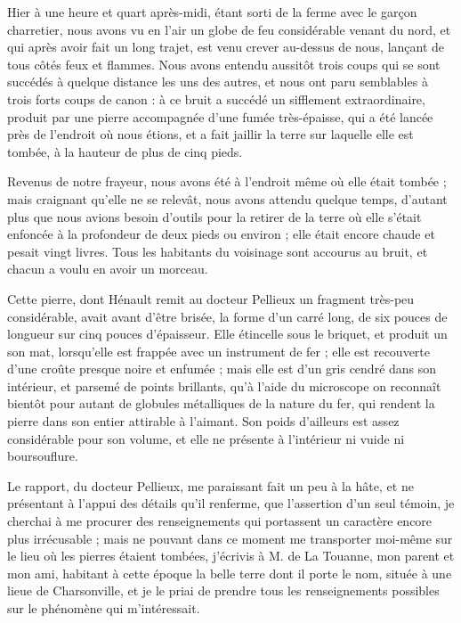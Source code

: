 \documentclass[a4paper, 12pt, oneside, french]{article}
\begin{document}
\og Hier à une heure et quart après-midi, étant sorti de la ferme avec le garçon charretier, nous avons vu en l'air un globe de feu considérable venant du nord, et qui après avoir fait un long trajet, est venu crever au-dessus de nous, lançant de tous côtés feux et flammes. Nous avons entendu aussitôt trois coups qui se sont succédés à quelque distance les uns des autres, et nous ont paru semblables à trois forts coups de canon : à ce bruit a succédé un sifflement extraordinaire, produit par une pierre accompagnée d'une fumée très-épaisse, qui a été lancée près de l'endroit où nous étions, et a fait jaillir la terre sur laquelle elle est tombée, à la hauteur de plus de cinq pieds. \fg

\og Revenus de notre frayeur, nous avons été à l'endroit même où elle était tombée ; mais craignant qu'elle ne se relevât, nous avons attendu quelque temps, d'autant plus que nous avions besoin d'outils pour la retirer de la terre où elle s'était enfoncée à la profondeur de deux pieds ou environ ; elle était encore chaude et pesait vingt livres. Tous les habitants du voisinage sont accourus au bruit, et chacun a voulu en avoir un morceau. \fg

Cette pierre, dont Hénault remit au docteur Pellieux un fragment très-peu considérable, avait avant d'être brisée, la forme d'un carré long, de six pouces de longueur sur cinq pouces d'épaisseur. Elle étincelle sous le briquet, et produit un son mat, lorsqu'elle est frappée avec un instrument de fer ; elle est recouverte d'une croûte presque noire et enfumée ; mais elle est d'un gris cendré dans son intérieur, et parsemé de points brillants, qu'à l'aide du microscope on reconnaît bientôt pour autant de globules métalliques de la nature du fer, qui rendent la pierre dans son entier attirable à l'aimant. Son poids d'ailleurs est assez considérable pour son volume, et elle ne présente à l'intérieur ni vuide ni boursouflure.

Le rapport, du docteur Pellieux, me paraissant fait un peu à la hâte, et ne présentant à l'appui des détails qu'il renferme, que l'assertion d'un seul témoin, je cherchai à me procurer des renseignements qui portassent un caractère encore plus irrécusable ; mais ne pouvant dans ce moment me transporter moi-même sur le lieu où les pierres étaient tombées, j'écrivis à M. de La Touanne, mon parent et mon ami, habitant à cette époque la belle terre dont il porte le nom, située à une lieue de Charsonville, et je le priai de prendre tous les renseignements possibles sur le phénomène qui m'intéressait.
\end{document}
